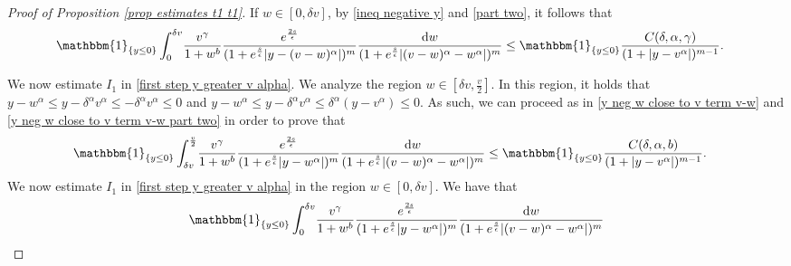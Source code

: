\documentclass[11pt]{article}
\numberwithin{equation}{section}
\newcommand{\der}{\textup{d}}
\begin{document}
\begin{proof}[Proof of Proposition 
\ref{prop estimates t1 t1}]
If  $w\in[0, \delta v]$, by \eqref{ineq negative y} and \eqref{part two}, it follows that
\begin{align*}
\mathbbm{1}_{\{y\leq 0\}}\int_{0}^{\delta v}&\frac{v^{\gamma}}{1+w^{b}}\frac{e^{\frac{2s}{\epsilon}}}{(1+e^{\frac{s}{\epsilon}}|y-(v-w)^{\alpha}|)^{m}}\frac{\der w}{(1+e^{\frac{s}{\epsilon}}|(v-w)^{\alpha}-w^{\alpha}|)^{m}}\leq    \mathbbm{1}_{\{y\leq 0\}}\frac{C(\delta,\alpha,\gamma)}{(1+|y-v^{\alpha}|)^{m-1}}.
\end{align*}


We now estimate $I_{1}$ in \eqref{first step y greater v alpha}.  We analyze the region $w\in[\delta v, \frac{v}{2}]$. In this region, it holds that $y-w^{\alpha}\leq y-\delta^{\alpha} v^{\alpha}\leq -\delta^{\alpha} v^{\alpha}\leq 0$ and $y-w^{\alpha}\leq y-\delta^{\alpha} v^{\alpha}\leq \delta^{\alpha}(y-v^{\alpha})\leq 0$. As such, we can proceed as in \eqref{y neg w close to v term v-w} and \eqref{y neg w close to v term v-w part two} in order to prove that
\begin{align*}
   \mathbbm{1}_{\{y\leq 0\}} \int_{\delta v}^{\frac{v}{2}} & \frac{v^{\gamma}}{1+w^{b}}\frac{e^{\frac{2s}{\epsilon}}}{(1+e^{\frac{s}{\epsilon}}|y-w^{\alpha}|)^{m}}\frac{\der w}{(1+e^{\frac{s}{\epsilon}}|(v-w)^{\alpha}-w^{\alpha}|)^{m}}  \leq  \mathbbm{1}_{\{y\leq 0\}}\frac{C(\delta,\alpha,b)}{(1+|y-v^{\alpha}|)^{m-1}} .
\end{align*}
We now estimate $I_{1}$ in \eqref{first step y greater v alpha} in the region $w\in[0, \delta v]$. We have that
\begin{align*}
    \mathbbm{1}_{\{y\leq 0\}}  \int_{0}^{\delta v} & \frac{v^{\gamma}}{1+w^{b}}\frac{e^{\frac{2s}{\epsilon}}}{(1+e^{\frac{s}{\epsilon}}|y-w^{\alpha}|)^{m}}\frac{\der w}{(1+e^{\frac{s}{\epsilon}}|(v-w)^{\alpha}-w^{\alpha}|)^{m}}\\

\end{align*}
\end{proof}
\end{document}
